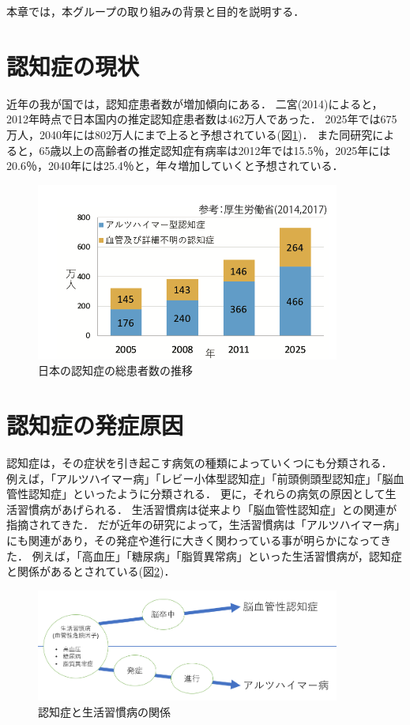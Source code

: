 \documentclass[../report]{subfiles}
\begin{document}
本章では，本グループの取り組みの背景と目的を説明する．


\section{認知症の現状}
近年の我が国では，認知症患者数が増加傾向にある．
二宮(2014)によると，2012年時点で日本国内の推定認知症患者数は462万人であった\cite{syourai}．
2025年では675万人，2040年には802万人にまで上ると予想されている(図\ref{fig:ninchisyo-graph})．
また同研究によると，65歳以上の高齢者の推定認知症有病率は2012年では15.5％，2025年には20.6％，2040年には25.4％と，年々増加していくと予想されている\cite{syourai}．
\begin{figure}[htbp]
    \begin{center}
        \includegraphics[width=10cm]{imgs/1_ninchisyo-graph.png}
        \caption{日本の認知症の総患者数の推移}
        \label{fig:ninchisyo-graph}
    \end{center}
\end{figure}


\section{認知症の発症原因} \label{sec:cause}
認知症は，その症状を引き起こす病気の種類によっていくつにも分類される．
例えば，「アルツハイマー病」「レビー小体型認知症」「前頭側頭型認知症」「脳血管性認知症」といったように分類される．
更に，それらの病気の原因として生活習慣病があげられる．
生活習慣病は従来より「脳血管性認知症」との関連が指摘されてきた．
だが近年の研究によって，生活習慣病は「アルツハイマー病」にも関連があり，その発症や進行に大きく関わっている事が明らかになってきた\cite{seikatsu}．
例えば，「高血圧」「糖尿病」「脂質異常病」といった生活習慣病が，認知症と関係があるとされている(図\ref{fig:relation-dementia-life-habit})．
\begin{figure}[htbp]
    \begin{center}
        \includegraphics[width=10cm]{imgs/1_relation-dementia-life-habit.png}
        \caption{認知症と生活習慣病の関係}
        \label{fig:relation-dementia-life-habit}
    \end{center}
\end{figure}
\end{document}
